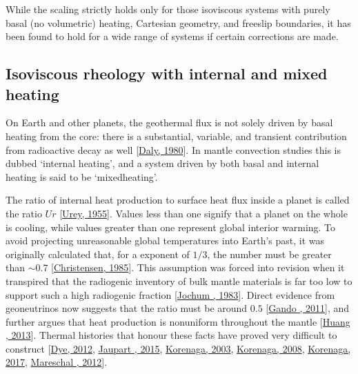 \documentclass[letterpaper,10pt,english]{jupyterBook}
\begin{document}
\sphinxAtStartPar
While the  scaling strictly holds only for those isoviscous systems with purely basal (no volumetric) heating, Cartesian geometry, and free\sphinxhyphen{}slip boundaries, it has been found to hold for a wide range of systems if certain corrections are made.


\subsection{Isoviscous rheology with internal and mixed heating}
\label{\detokenize{content/chapter_04_isoviscous/background/heating:isoviscous-rheology-with-internal-and-mixed-heating}}\label{\detokenize{content/chapter_04_isoviscous/background/heating::doc}}
\sphinxAtStartPar
On Earth and other planets, the geothermal flux is not solely driven by basal heating from the core: there is a substantial, variable, and transient contribution from radioactive decay as well {[}\hyperlink{cite.references:id774}{Daly, 1980}{]}. In mantle convection studies this is dubbed ‘internal heating’, and a system driven by both basal and internal heating is said to be ‘mixed\sphinxhyphen{}heating’.

\sphinxAtStartPar
The ratio of internal heat production to surface heat flux inside a planet is called the  ratio \(Ur\)  {[}\hyperlink{cite.references:id367}{Urey, 1955}{]}. Values less than one signify that a planet on the whole is cooling, while values greater than one represent global interior warming. To avoid projecting unreasonable global temperatures into Earth’s past, it was originally calculated that, for a  exponent of \(1/3\), the  number must be greater than \(\sim0.7\) {[}\hyperlink{cite.references:id777}{Christensen, 1985}{]}. This assumption was forced into revision when it transpired that the radiogenic inventory of bulk mantle materials is far too low to support such a high radiogenic fraction {[}\hyperlink{cite.references:id920}{Jochum , 1983}{]}. Direct evidence from geoneutrinos now suggests that the  ratio must be around \(0.5\) {[}\hyperlink{cite.references:id522}{Gando , 2011}{]}, and further argues that heat production is non\sphinxhyphen{}uniform throughout the mantle {[}\hyperlink{cite.references:id377}{Huang , 2013}{]}. Thermal histories that honour these facts have proved very difficult to construct {[}\hyperlink{cite.references:id660}{Dye, 2012}, \hyperlink{cite.references:id392}{Jaupart , 2015}, \hyperlink{cite.references:id306}{Korenaga, 2003}, \hyperlink{cite.references:id472}{Korenaga, 2008}, \hyperlink{cite.references:id831}{Korenaga, 2017}, \hyperlink{cite.references:id365}{Mareschal , 2012}{]}.
\end{document}
